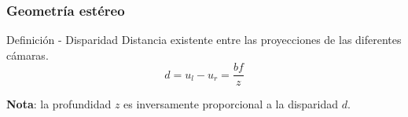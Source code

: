 \documentclass[compress]{beamer}
\begin{document}
\begin{frame}
	\frametitle{Geometría estéreo}

	\begin{block}{Definición - Disparidad}
		Distancia existente entre las proyecciones de las diferentes cámaras.
	\begin{equation}
		d=u_{l}-u_{r}=\frac{bf}{z}
	\end{equation}
	\end{block}

	\textbf{Nota}: la profundidad $z$ es inversamente proporcional a la disparidad $d$.

	\vspace{-1em}
	\begin{figure}[!htb]
		\centering
		\hfill
		\centering
		\hfill
	\end{figure}

\end{frame}
\end{document}
